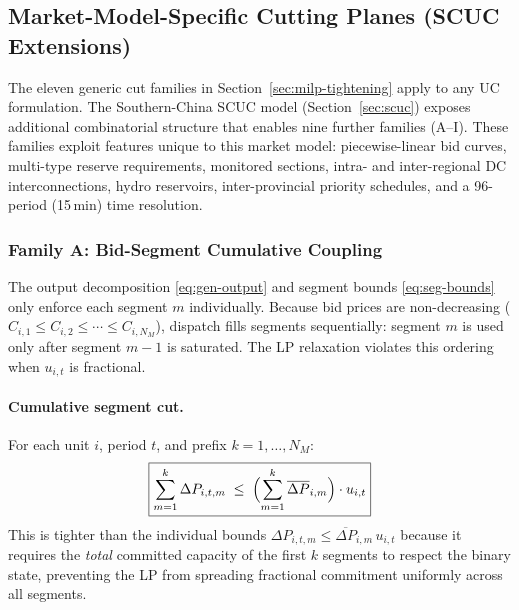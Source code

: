 \subsection{Market-Model-Specific Cutting Planes (SCUC Extensions)}
\label{sec:scuc-market-cuts}

The eleven generic cut families in Section~\ref{sec:milp-tightening} apply
to any UC formulation.  The Southern-China SCUC model
(Section~\ref{sec:scuc}) exposes additional combinatorial structure that
enables nine further families (A--I).  These families exploit features
unique to this market model: piecewise-linear bid curves, multi-type
reserve requirements, monitored sections, intra- and inter-regional DC
interconnections, hydro reservoirs, inter-provincial priority schedules,
and a 96-period (15\,min) time resolution.

\subsubsection{Family A: Bid-Segment Cumulative Coupling}
\label{sec:cut-A}

The output decomposition \eqref{eq:gen-output} and segment bounds
\eqref{eq:seg-bounds} only enforce each segment $m$ individually.
Because bid prices are non-decreasing ($C_{i,1} \leq C_{i,2} \leq
\cdots \leq C_{i,N_M}$), dispatch fills segments sequentially: segment
$m$ is used only after segment $m-1$ is saturated.  The LP relaxation
violates this ordering when $u_{i,t}$ is fractional.

\paragraph{Cumulative segment cut.}
For each unit $i$, period $t$, and prefix $k = 1, \ldots, N_M$:
\begin{equation}\label{eq:cut-A-cumul}
  \boxed{
    \sum_{m=1}^{k} \Delta P_{i,t,m}
    \;\leq\;
    \Bigl(\sum_{m=1}^{k} \overline{\Delta P}_{i,m}\Bigr) \cdot u_{i,t}
  }
\end{equation}
This is tighter than the individual bounds $\Delta P_{i,t,m} \leq
\overline{\Delta P}_{i,m}\,u_{i,t}$ because it requires the \emph{total}
committed capacity of the first $k$ segments to respect the binary state,
preventing the LP from spreading fractional commitment uniformly across
all segments.


